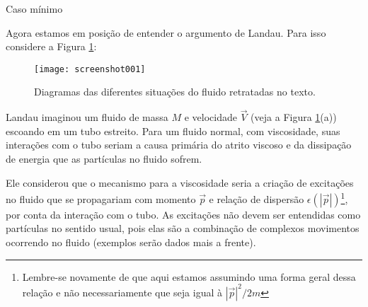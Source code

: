\documentclass[]{IMTexam}
\begin{document}
\begin{questions}
\begin{parts}
\begin{solution}
\begin{multi}[3]

				Caso mínimo
			\end{multi}

			\hfill\qedsymbol
		\end{solution}
	\end{parts}

	\medskip

	\question \label{ques:q2}
	Agora estamos em posição de entender o argumento de Landau. Para isso considere a Figura \ref{fig:fig1}:

	\begin{figure}[H]
		\centering
		\texttt{[image: screenshot001]}
		\caption{Diagramas das diferentes situações do fluido retratadas no texto.}
		\label{fig:fig1}
	\end{figure}

	Landau imaginou um fluido de massa $ M $ e velocidade $\vec{V}$ (veja a Figura \ref{fig:fig1}(a)) escoando em um tubo estreito. Para um fluido normal, com viscosidade, suas interações com o tubo seriam a causa primária do atrito viscoso e da dissipação de energia que as partículas no fluido sofrem.

	Ele considerou que o mecanismo para a viscosidade seria a criação de excitações no fluido que se propagariam com momento $\vec{p}$ e relação de dispersão $\epsilon(|\vec{p}|)$\footnote{Lembre-se novamente de que aqui estamos assumindo uma forma geral dessa relação e não necessariamente que seja igual à $ |\vec{p}|^{2}/2m $}, por conta da interação com o tubo. As excitações não devem ser entendidas como partículas no sentido usual, pois elas são a combinação de complexos movimentos ocorrendo no fluido (exemplos serão dados mais a frente).

\end{questions}
\end{document}
